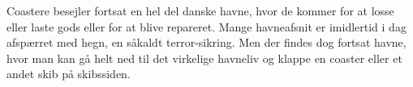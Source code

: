 Coastere besejler fortsat en hel del danske havne, hvor de kommer for at
losse eller laste gods eller for at blive repareret. Mange havneafsnit er
imidlertid i dag afspærret med hegn, en såkaldt terror-sikring. Men der
findes dog fortsat havne, hvor man kan gå helt ned til det virkelige
havneliv og klappe en coaster eller et andet skib på skibssiden.
